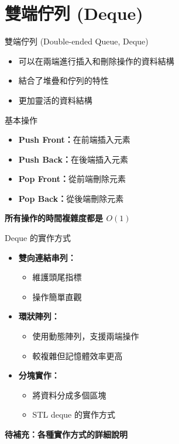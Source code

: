 \documentclass{beamer}
\begin{document}
\section{雙端佇列 (Deque)}

\begin{frame}{雙端佇列 (Double-ended Queue, Deque)}
\begin{itemize}
    \item 可以在兩端進行插入和刪除操作的資料結構
    \item 結合了堆疊和佇列的特性
    \item 更加靈活的資料結構
\end{itemize}

\vspace{1em}
\begin{block}{基本操作}
\begin{itemize}
    \item \textbf{Push Front：}在前端插入元素
    \item \textbf{Push Back：}在後端插入元素
    \item \textbf{Pop Front：}從前端刪除元素
    \item \textbf{Pop Back：}從後端刪除元素
\end{itemize}
\end{block}

\vspace{1em}
\textbf{所有操作的時間複雜度都是 $O(1)$}
\end{frame}

\begin{frame}{Deque 的實作方式}
\begin{itemize}
    \item \textbf{雙向連結串列：}
    \begin{itemize}
        \item 維護頭尾指標
        \item 操作簡單直觀
    \end{itemize}
    \item \textbf{環狀陣列：}
    \begin{itemize}
        \item 使用動態陣列，支援兩端操作
        \item 較複雜但記憶體效率更高
    \end{itemize}
    \item \textbf{分塊實作：}
    \begin{itemize}
        \item 將資料分成多個區塊
        \item STL deque 的實作方式
    \end{itemize}
\end{itemize}

\vspace{1em}
\textbf{待補充：各種實作方式的詳細說明}
\end{frame}
\end{document}

